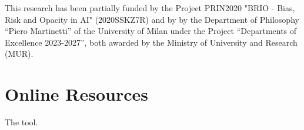 \documentclass[
]{ceurart}
\begin{document}
%
%
%


\begin{acknowledgments}
This research has been partially funded by the Project PRIN2020 "BRIO - Bias, Risk and Opacity in AI" (2020SSKZ7R) and by by the Department of Philosophy “Piero Martinetti” of the University of Milan under the Project “Departments of Excellence 2023-2027”, both awarded by the Ministry of University and Research (MUR).
\end{acknowledgments}



\appendix

\section{Online Resources}
The tool.
\end{document}
